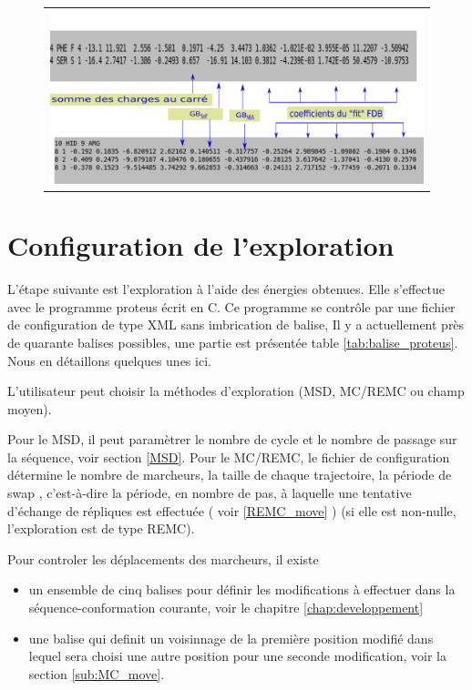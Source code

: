 \begin{enumerate}
   \begin{figure}[!htbp]
     \centering
     \begin{tabular}{c}
       \includegraphics[width=12cm]{figure/inputenerGB.png} 
     \end{tabular}     
     \caption{}
\label{fig:GBenerfile}
   \end{figure}
   

\section{Configuration de l'exploration}

L'étape suivante est l'exploration à l'aide des énergies obtenues. Elle s'effectue avec le programme proteus écrit en C. Ce programme se contrôle par une fichier de configuration de type XML sans imbrication de balise, Il y a actuellement près de quarante balises possibles, une partie est présentée table \ref{tab:balise_proteus}. Nous en détaillons quelques unes ici.

L'utilisateur peut choisir la méthodes d'exploration (MSD, MC/REMC ou champ moyen).

Pour le MSD, il peut paramètrer le nombre de cycle et le nombre de passage sur la séquence, voir section \ref{MSD}.
Pour le MC/REMC, le fichier de configuration détermine le nombre de marcheurs, la taille de chaque trajectoire, la période de \og swap \fg, c'est-à-dire la période, en nombre de pas, à laquelle une tentative d'échange de répliques est effectuée ( voir \ref{REMC_move} ) (si elle est non-nulle, l'exploration est de type REMC).

Pour controler les déplacements des marcheurs, il existe 
\begin{itemize}
\item un ensemble de cinq  balises pour définir les modifications à effectuer dans la séquence-conformation courante, voir le chapitre \ref{chap:developpement}
\item une balise qui definit un voisinnage de la première position modifié dans lequel sera choisi une autre position pour une seconde modification, voir la section \ref{sub:MC_move}.
\end{itemize}


\end{enumerate}
